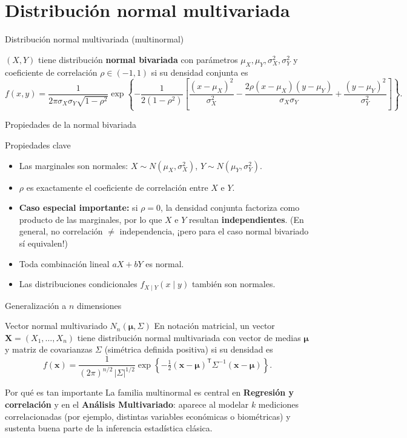 \documentclass[aspectratio=169,11pt]{beamer}
\begin{document}
\section{Distribución normal multivariada}

\begin{frame}{Distribución normal multivariada (multinormal)}
\begin{definition}
$(X,Y)$ tiene distribución \textbf{normal bivariada} con parámetros $\mu_X,\mu_Y,\sigma_X^2,\sigma_Y^2$ y coeficiente de correlación $\rho\in(-1,1)$ si su densidad conjunta es
\[
f(x,y) = \frac{1}{2\pi\sigma_X\sigma_Y\sqrt{1-\rho^2}} \exp\left\{-\frac{1}{2(1-\rho^2)}\left[\frac{(x-\mu_X)^2}{\sigma_X^2} - \frac{2\rho(x-\mu_X)(y-\mu_Y)}{\sigma_X\sigma_Y} + \frac{(y-\mu_Y)^2}{\sigma_Y^2}\right]\right\}.
\]
\end{definition}
\end{frame}

\begin{frame}{Propiedades de la normal bivariada}
\begin{block}{Propiedades clave}
\begin{itemize}
\item Las marginales son normales: $X\sim N(\mu_X,\sigma_X^2)$, $Y\sim N(\mu_Y,\sigma_Y^2)$.
\item $\rho$ es exactamente el coeficiente de correlación entre $X$ e $Y$.
\item \textbf{Caso especial importante:} si $\rho=0$, la densidad conjunta factoriza como producto de las marginales, por lo que $X$ e $Y$ resultan \textbf{independientes}. (En general, no correlación $\ne$ independencia, ¡pero para el caso normal bivariado sí equivalen!)
\item Toda combinación lineal $aX+bY$ es normal.
\item Las distribuciones condicionales $f_{X\mid Y}(x\mid y)$ también son normales.
\end{itemize}
\end{block}
\end{frame}

\begin{frame}{Generalización a $n$ dimensiones}
\begin{block}{Vector normal multivariado $N_n(\boldsymbol\mu,\Sigma)$}
En notación matricial, un vector $\mathbf{X}=(X_1,\ldots,X_n)$ tiene distribución normal multivariada con vector de medias $\boldsymbol\mu$ y matriz de covarianzas $\Sigma$ (simétrica definida positiva) si su densidad es
\[
f(\mathbf{x}) = \frac{1}{(2\pi)^{n/2}\,|\Sigma|^{1/2}} \exp\left\{-\tfrac12 (\mathbf{x}-\boldsymbol\mu)^{\mathsf T}\Sigma^{-1}(\mathbf{x}-\boldsymbol\mu)\right\}.
\]
\end{block}
\begin{alertblock}{Por qué es tan importante}
La familia multinormal es central en \textbf{Regresión y correlación} y en el \textbf{Análisis Multivariado}: aparece al modelar $k$ mediciones correlacionadas (por ejemplo, distintas variables económicas o biométricas) y sustenta buena parte de la inferencia estadística clásica.
\end{alertblock}
\end{frame}
\end{document}
